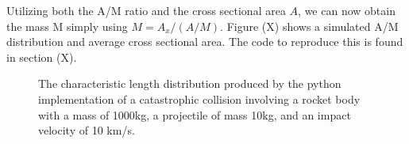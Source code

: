 \documentclass{article}
\begin{document}
Utilizing both the A/M ratio and the cross sectional area $A$, we can now obtain the mass M simply using
$M = A_x / (A/M)$.
Figure (X)  shows a simulated A/M distribution and average cross sectional area. The code to reproduce this is found in section (X).
\begin{figure}[H]
	\begin{adjustbox}{max width=1.5\linewidth,center}
		\centering     %
	\end{adjustbox}
	\caption{The characteristic length distribution produced by the python implementation of a catastrophic collision involving a rocket body with a mass of 1000kg, a projectile of mass 10kg, and an impact velocity of 10 km/s. }
\end{figure}
\end{document}
